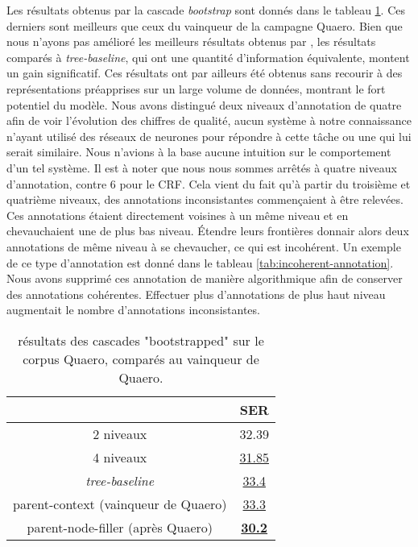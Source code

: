 \documentclass[PhD-Yoann-Dupont.tex]{subfiles}
\begin{document}
Les résultats obtenus par la cascade \textit{bootstrap} sont donnés dans le tableau \ref{tab:bootstrap-results}. Ces derniers sont meilleurs que ceux du vainqueur de la campagne Quaero. Bien que nous n'ayons pas amélioré les meilleurs résultats obtenus par \citet{dinarelli2012}, les résultats comparés à \textit{tree-baseline}, qui ont une quantité d'information équivalente, montent un gain significatif. Ces résultats ont par ailleurs été obtenus sans recourir à des représentations préapprises sur un large volume de données, montrant le fort potentiel du modèle. Nous avons distingué deux niveaux d'annotation de quatre afin de voir l'évolution des chiffres de qualité, aucun système à notre connaissance n'ayant utilisé des réseaux de neurones pour répondre à cette tâche ou une qui lui serait similaire. Nous n'avions à la base aucune intuition sur le comportement d'un tel système. Il est à noter que nous nous sommes arrêtés à quatre niveaux d'annotation, contre 6 pour le CRF. Cela vient du fait qu'à partir du troisième et quatrième niveaux, des annotations inconsistantes commençaient à être relevées. Ces annotations étaient directement voisines à un même niveau et en chevauchaient une de plus bas niveau. Étendre leurs frontières donnair alors deux annotations de même niveau à se chevaucher, ce qui est incohérent. Un exemple de ce type d'annotation est donné dans le tableau \ref{tab:incoherent-annotation}. Nous avons supprimé ces annotation de manière algorithmique afin de conserver des annotations cohérentes. Effectuer plus d'annotations de plus haut niveau augmentait le nombre d'annotations inconsistantes.

\begin{table}[ht!]
\centering
\begin{tabular}{|c|c|}
\cline{2-2}
\multicolumn{1}{c|}{} & SER \\
\hline
2 niveaux   & 32.39       \\
4 niveaux   & \underline{31.85}       \\
\hline
\citet{dinarelli2012} \textit{tree-baseline} & \underline{33.4} \\
\citet{dinarelli2012} parent-context (vainqueur de Quaero) & \underline{33.3} \\
\citet{dinarelli2012} parent-node-filler (après Quaero) & \textbf{\underline{30.2}} \\
\hline
\end{tabular}
\caption{résultats des cascades "bootstrapped" sur le corpus Quaero, comparés au vainqueur de Quaero.}
\label{tab:bootstrap-results}
\end{table}
\end{document}
